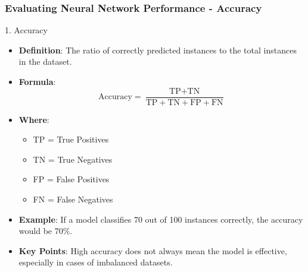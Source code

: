 \documentclass[aspectratio=169]{beamer}
\begin{document}
\begin{frame}[fragile]
    \frametitle{Evaluating Neural Network Performance - Accuracy}
    \begin{block}{1. Accuracy}
        \begin{itemize}
            \item \textbf{Definition}: The ratio of correctly predicted instances to the total instances in the dataset.
            \item \textbf{Formula}:
            \begin{equation}
                \text{Accuracy} = \frac{\text{TP} + \text{TN}}{\text{TP} + \text{TN} + \text{FP} + \text{FN}}
            \end{equation}
            \item \textbf{Where}: 
            \begin{itemize}
                \item TP = True Positives
                \item TN = True Negatives
                \item FP = False Positives
                \item FN = False Negatives
            \end{itemize}
            \item \textbf{Example}: If a model classifies 70 out of 100 instances correctly, the accuracy would be 70\%.
            \item \textbf{Key Points}: High accuracy does not always mean the model is effective, especially in cases of imbalanced datasets.
        \end{itemize}
    \end{block}
\end{frame}
\end{document}
